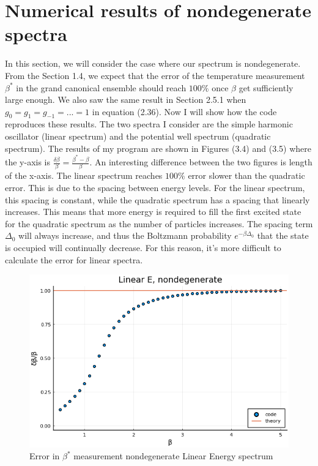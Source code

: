 \section{Numerical results of nondegenerate spectra}
In this section, we will consider the case where our spectrum is nondegenerate. From the Section 1.4, we expect that the error of the temperature measurement $\beta^*$ in the grand canonical ensemble should reach $100\%$ once $\beta$ get sufficiently large enough. We also saw the same result in Section 2.5.1 when $g_0=g_1=g_{-1}=...=1$ in equation (2.36). Now I will show how the code reproduces these results. The two spectra I consider are the simple harmonic oscillator (linear spectrum) and the potential well spectrum (quadratic spectrum). The results of my program are shown in Figures (3.4) and (3.5) where the y-axis is $\frac{\delta\beta}{\beta}=\frac{\beta^*-\beta}{\beta}$. An interesting difference between the two figures is length of the x-axis. The linear spectrum reaches $100\%$ error slower than the quadratic error. This is due to the spacing between energy levels. For the linear spectrum, this spacing is constant, while the quadratic spectrum has a spacing that linearly increases. This means that more energy is required to fill the first excited state for the quadratic spectrum as the number of particles increases. The spacing term $\Delta_0$ will always increase, and thus the Boltzmann probability $e^{-\beta\Delta_0}$ that the state is occupied will continually decrease. For this reason, it's more difficult to calculate the error for linear spectra. 

\begin{figure}[H]
    \centering
    \includegraphics[scale=0.75]{figures/pdf/linEnondeg.png}
    \caption{Error in $\beta^*$ measurement nondegenerate Linear Energy spectrum}
    \label{fig:Error2}
\end{figure}

